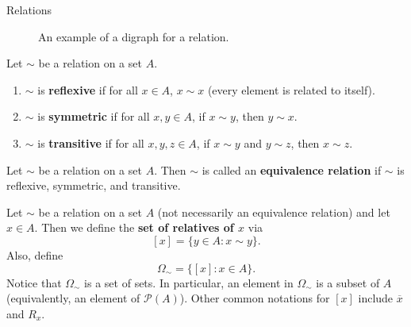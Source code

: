 \begin{section}{Relations}
\begin{example}
\begin{figure}[h]
\begin{center}
\caption{An example of a digraph for a relation.}\label{fig:digraph}
\end{center}
\end{figure}

\end{example}

\begin{definition}
Let $\sim$ be a relation on a set $A$.
\begin{enumerate}
\item $\sim$ is \textbf{reflexive} if for all $x\in A$, $x\sim x$ (every element is related to itself).
\item $\sim$ is \textbf{symmetric} if for all $x,y\in A$, if $x\sim y$, then $y\sim x$.
\item $\sim$ is \textbf{transitive} if for all $x,y,z\in A$, if $x\sim y$ and $y\sim z$, then $x\sim z$.
\end{enumerate}
\end{definition}

\begin{definition}
Let $\sim$ be a relation on a set $A$.  Then $\sim$ is called an \textbf{equivalence relation} if $\sim$ is reflexive, symmetric, and transitive.
\end{definition}

\begin{definition}
Let $\sim$ be a relation on a set $A$ (not necessarily an equivalence relation) and let $x\in A$.  Then we define the \textbf{set of relatives of $x$} via
\[
[x]=\{y\in A: x\sim y\}.
\]
Also, define
\[
\Omega_{\sim}=\{[x]:x\in A\}.
\]
Notice that $\Omega_{\sim}$ is a set of sets.  In particular, an element in $\Omega_{\sim}$ is a subset of $A$ (equivalently, an element of $\mathcal{P}(A)$).  Other common notations for $[x]$ include $\overline{x}$ and $R_x$.
\end{definition}


\end{section}
